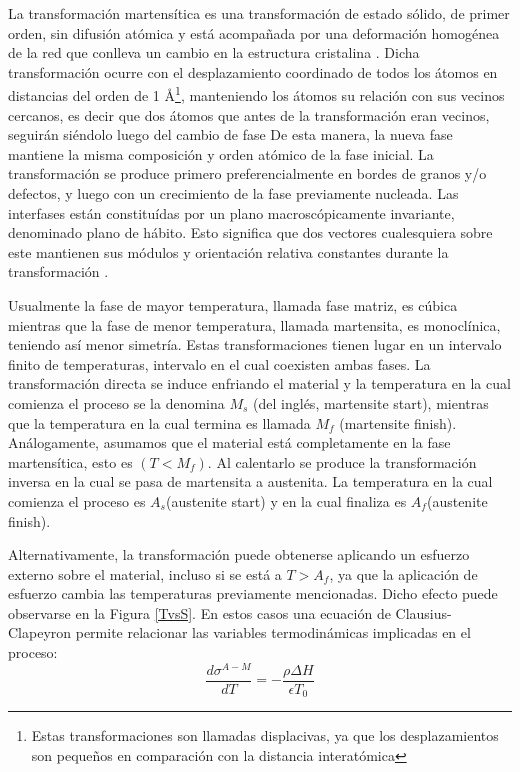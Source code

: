 \documentclass{article}
\theoremstyle{definition}
\theoremstyle{remark}
\begin{document}
La transformación martensítica es una transformación de estado sólido, de primer orden, sin difusión atómica y está acompañada por una deformación homogénea de la red que conlleva un cambio en la estructura cristalina \cite{Santamarta}. Dicha transformación ocurre con el desplazamiento coordinado de todos los átomos en distancias del orden de 1 \AA \footnote{Estas transformaciones son llamadas displacivas, ya que los desplazamientos son pequeños en comparación con la distancia interatómica}, manteniendo los átomos su relación con sus vecinos cercanos, es decir que dos átomos que antes de la transformación eran vecinos, seguirán siéndolo luego del cambio de fase\citep{HTSMA} De esta manera, la nueva fase mantiene la misma composición y orden atómico de la fase inicial. La transformación se produce primero preferencialmente en bordes de granos y/o defectos, y luego con un crecimiento de la fase previamente nucleada. Las interfases están constituídas por un plano macroscópicamente invariante, denominado plano de hábito. Esto significa que dos vectores cualesquiera sobre este mantienen sus módulos y orientación relativa constantes durante la transformación \cite{Santamarta}.

Usualmente la fase de mayor temperatura, llamada fase matriz, es cúbica mientras que la fase de menor temperatura, llamada martensita, es monoclínica, teniendo así menor simetría\cite{Malvasio}. Estas transformaciones tienen lugar en un intervalo finito de temperaturas, intervalo en el cual coexisten ambas fases. La transformación directa se induce enfriando el material y la temperatura en la cual comienza el proceso se la denomina $M_s$ (del inglés, martensite start), mientras que la temperatura en la cual termina es llamada $M_f$ (martensite finish). Análogamente, asumamos que el material está completamente en la fase martensítica, esto es $(T < M_f)$. Al calentarlo se produce la transformación inversa en la cual se pasa de martensita a austenita. La temperatura en la cual comienza el proceso es $A_s$(austenite start) y en la cual finaliza es $A_f$(austenite finish).\cite{Santamarta}

Alternativamente, la transformación puede obtenerse aplicando un esfuerzo externo sobre el material, incluso si se está a $T > A_f$, ya que la aplicación de esfuerzo cambia las temperaturas previamente mencionadas. Dicho efecto puede observarse en la Figura \ref{TvsS}. En estos casos una ecuación de Clausius-Clapeyron permite relacionar las variables termodinámicas implicadas en el proceso:
\begin{equation}
	\frac{d\sigma^{A-M}}{dT} = -\frac{\rho \Delta H}{\epsilon T_0}
\end{equation}
\end{document}
